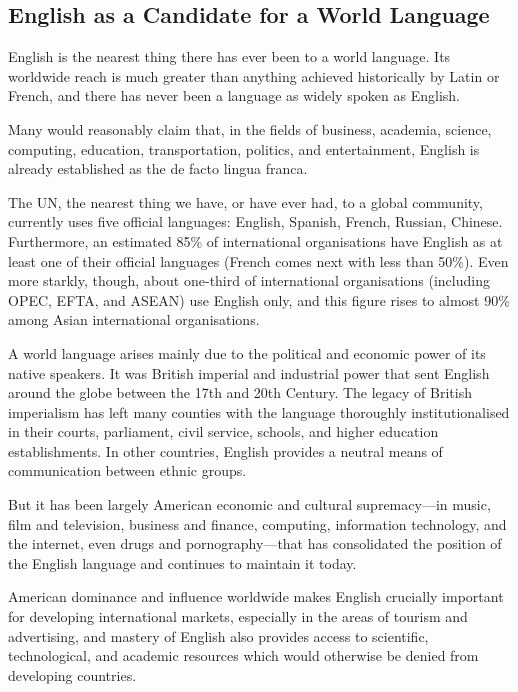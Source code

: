 \documentclass[../main.tex]{subfiles}
\begin{document}
    \subsection{English as a Candidate for a World Language}
        English is the nearest thing there has ever been to a world language. Its worldwide reach is much greater than anything achieved historically by Latin or French, and there has never been a language as widely spoken as English. \par 
        Many would reasonably claim that, in the fields of business, academia, science, computing, education, transportation, politics, and entertainment, English is already established as the de facto lingua franca. \par 
        The UN, the nearest thing we have, or have ever had, to a global community, currently uses five official languages: English, Spanish, French, Russian, Chinese. Furthermore, an estimated 85\% of international organisations have English as at least one of their official languages (French comes next with less than 50\%). Even more starkly, though, about one-third of international organisations (including OPEC, EFTA, and ASEAN) use English only, and this figure rises to almost 90\% among Asian international organisations.  \par 
        A world language arises mainly due to the political and economic power of its native speakers. It was British imperial and industrial power that sent English around the globe between the 17th and 20th Century. The legacy of British imperialism has left many counties with the language thoroughly institutionalised in their courts, parliament, civil service, schools, and higher education establishments. In other countries, English provides a neutral means of communication between ethnic groups. \par
        But it has been largely American economic and cultural supremacy---in music, film and television, business and finance, computing, information technology, and the internet, even drugs and pornography---that has consolidated the position of the English language and continues to maintain it today. \par 
        American dominance and influence worldwide makes English crucially important for developing international markets, especially in the areas of tourism and advertising, and mastery of English also provides access to scientific, technological, and academic resources which would otherwise be denied from developing countries. 
\end{document}
